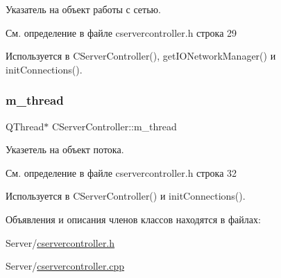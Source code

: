 Указатель на объект работы с сетью. 



См. определение в файле cservercontroller.\+h строка 29



Используется в C\+Server\+Controller(), get\+I\+O\+Network\+Manager() и init\+Connections().

\hypertarget{class_c_server_controller_a4a4764db869209e68283af91608f9751}{}\label{class_c_server_controller_a4a4764db869209e68283af91608f9751} 
\subsubsection{\texorpdfstring{m\+\_\+thread}{m\_thread}}
{\footnotesize\ttfamily Q\+Thread$\ast$ C\+Server\+Controller\+::m\+\_\+thread\hspace{0.3cm}{\ttfamily [private]}}



Указетель на объект потока. 



См. определение в файле cservercontroller.\+h строка 32



Используется в C\+Server\+Controller() и init\+Connections().



Объявления и описания членов классов находятся в файлах\+:\begin{DoxyCompactItemize}
\item 
Server/\hyperlink{cservercontroller_8h}{cservercontroller.\+h}\item 
Server/\hyperlink{cservercontroller_8cpp}{cservercontroller.\+cpp}\end{DoxyCompactItemize}
